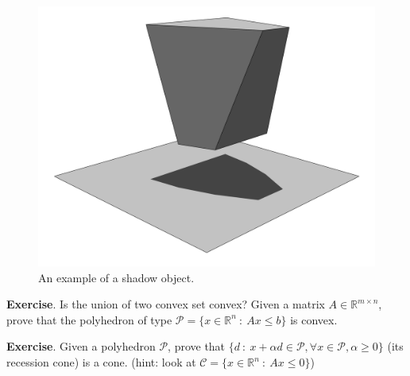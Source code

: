 \begin{itemize}
    \begin{figure}
        \centering
        \includegraphics[scale=0.05]{figures/2/chapter2-shadow.png}
        \caption{An example of a shadow object.}
        \label{fig:chapter2-shadow}
    \end{figure}
\end{itemize}
\par \textbf{Exercise}. Is the union of two convex set convex? Given a matrix $A \in \mathbb{R}^{m \times n}$, prove that the polyhedron of type $\mathcal{P} = \{x \in \mathbb{R}^n\ :\ Ax \leq b\}$ is convex.
\par \textbf{Exercise}. Given a polyhedron $\mathcal{P}$, prove that $\{d\ :\ x + \alpha d \in \mathcal{P}, \forall x \in \mathcal{P}, \alpha \geq 0\}$ (its recession cone) is a cone. (hint: look at $\mathcal{C} = \{x \in \mathbb{R}^n\ :\ Ax \leq 0\}$)
%
